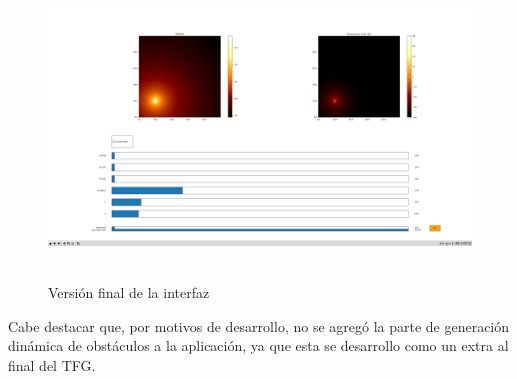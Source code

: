 \begin{figure} [H]
    \begin{center}
    \includegraphics[height=8cm]{imagenes/cap4/7_Friss_endGUI.png}
    \end{center}
	\caption[Versión final de la interfaz]{Versión final de la interfaz}
	\label{fig:friis_end_app}
\end{figure}

Cabe destacar que, por motivos de desarrollo, no se agregó la parte de generación dinámica de obstáculos a la aplicación, ya que esta se desarrollo como un extra al final del \ac{TFG}.\\






